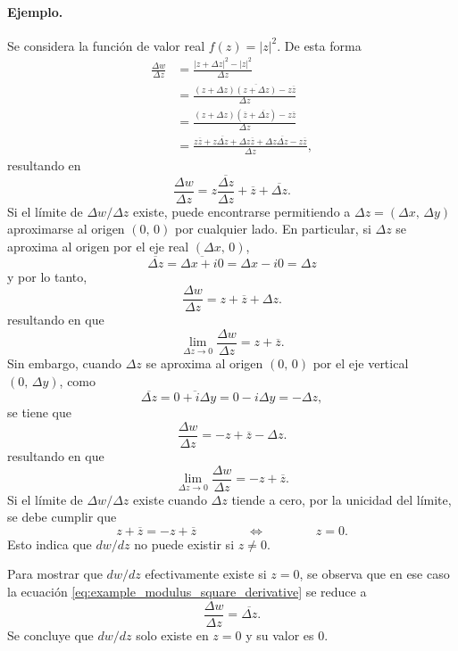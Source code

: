 \documentclass[a4paper]{report}
\begin{document}
\paragraph{Ejemplo.} Se considera la función de valor real \(f(z)=|z|^2\). De esta forma
\begin{align*}
 \frac{\Delta w}{\Delta z}&=\frac{|z+\Delta z|^2-|z|^2}{\Delta z}\\
  &=\frac{(z+\Delta z)\overline{(z+\Delta z)}-z\overline{z}}{\Delta z}\\
  &=\frac{(z+\Delta z)(\overline{z}+\overline{\Delta z})-z\overline{z}}{\Delta z}\\
  &=\frac{z\overline{z}+z\overline{\Delta z}+\Delta z\overline{z}+\Delta z\overline{\Delta z}-z\overline{z}}{\Delta z}, 
\end{align*}
resultando en
\begin{equation}\label{eq:example_modulus_square_derivative}
 \frac{\Delta w}{\Delta z}=z\frac{\overline{\Delta z}}{\Delta z}+\overline{z}+\overline{\Delta z}.
\end{equation}
Si el límite de \(\Delta w/\Delta z\) existe, puede encontrarse permitiendo a \(\Delta z=(\Delta x,\,\Delta y)\) aproximarse al origen \((0,\,0)\) por cualquier lado. En particular, si \(\Delta z\) se aproxima al origen por el eje real \((\Delta x,\,0)\),
\[
 \overline{\Delta z}=\overline{\Delta x+i0}=\Delta x-i0=\Delta z
\]
y por lo tanto,
\[
 \frac{\Delta w}{\Delta z}=z+\overline{z}+\Delta z.
\]
resultando en que 
\[
 \lim_{\Delta z\to0}\frac{\Delta w}{\Delta z}=z+\overline{z}.
\]
Sin embargo, cuando \(\Delta z\) se aproxima al origen \((0,\,0)\) por el eje vertical \((0,\,\Delta y)\), como
\[
 \overline{\Delta z}=\overline{0+i\Delta y}=0-i\Delta y=-\Delta z,
\]
se tiene que 
\[
 \frac{\Delta w}{\Delta z}=-z+\overline{z}-\Delta z.
\]
resultando en que 
\[
 \lim_{\Delta z\to0}\frac{\Delta w}{\Delta z}=-z+\overline{z}.
\]
Si el límite de \(\Delta w/\Delta z\) existe cuando \(\Delta z\) tiende a cero, por la unicidad del límite, se debe cumplir que 
\[
 z+\overline{z}=-z+\overline{z}
 \qquad\qquad\Leftrightarrow\qquad\qquad
 z=0.
\]
Esto indica que \(dw/dz\) no puede existir si \(z\neq0\).

Para mostrar que \(dw/dz\) efectivamente existe si \(z=0\), se observa que en ese caso la ecuación \ref{eq:example_modulus_square_derivative} se reduce a 
\[
 \frac{\Delta w}{\Delta z}=\overline{\Delta z}.
\]
Se concluye que \(dw/dz\) solo existe en \(z=0\) y su valor es 0.
\end{document}
